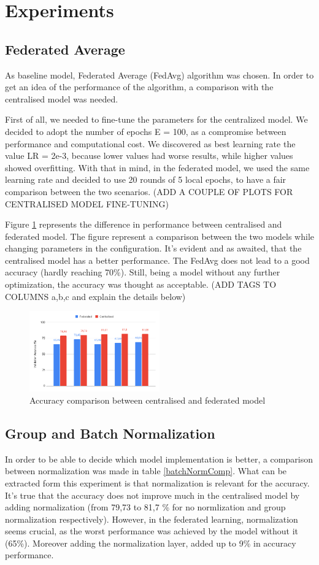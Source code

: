 \documentclass[twocolumn]{article}
\begin{document}
\section{Experiments} %
\subsection{Federated Average}
As baseline model, Federated Average (FedAvg) algorithm was chosen. In order to get an idea of the performance of the algorithm, a comparison with the centralised model was needed. 

First of all, we needed to fine-tune the parameters for the centralized model. We decided to adopt the number of epochs E = 100, as a compromise between performance and computational cost. We discovered as best learning rate the value LR = 2e-3, because lower values had worse results, while higher values showed overfitting. With that in mind, in the federated model, we used the same learning rate and decided to use 20 rounds of 5 local epochs, to have a fair comparison between the two scenarios.
(ADD A COUPLE OF PLOTS FOR CENTRALISED MODEL FINE-TUNING)

Figure \ref{AccCompFedCent} represents the difference in performance between centralised and federated model. The figure represent a comparison between the two models while changing parameters in the configuration. It's evident and as awaited, that the centralised model has a better performance. The FedAvg does not lead to a good accuracy (hardly reaching 70\%). Still, being a model without any further optimization, the accuracy was thought as acceptable. (ADD TAGS TO COLUMNS a,b,c and explain the details below)


\begin{figure}
    \centering
    \includegraphics[width=0.5\textwidth,height=.3\textheight]{FedAccuracyComp.png}
    \caption{Accuracy comparison between centralised and federated model}
     \label{AccCompFedCent} 
\end{figure}
\subsection{Group and Batch Normalization}
In order to be able to decide which model implementation is better, a comparison between normalization was made in table \ref{batchNormComp}. What can be extracted form this experiment is that normalization is relevant for the accuracy. It's true that the accuracy does not improve much in the centralised model by adding normalization (from 79,73 to 81,7 \% for no normlization and group normalization respectively). However, in the federated learning, normalization seems crucial, as the worst performance was achieved by the model without it (65\%). Moreover adding the normalization layer, added up to 9\% in accuracy performance. 
\end{document}
